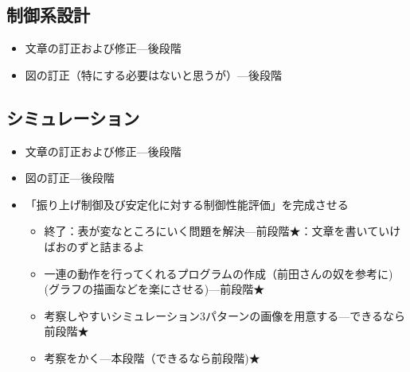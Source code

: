 	\subsection{制御系設計}
		\begin{itemize}
		  \item 文章の訂正および修正---後段階
		  \item 図の訂正（特にする必要はないと思うが）---後段階
		\end{itemize}
	\subsection{シミュレーション}
		\begin{itemize}
		  \item 文章の訂正および修正---後段階
		  \item 図の訂正---後段階
		  \item 「振り上げ制御及び安定化に対する制御性能評価」を完成させる
		  \begin{itemize}
		    \item 終了：表が変なところにいく問題を解決---前段階★：文章を書いていけばおのずと詰まるよ
		    \item 一連の動作を行ってくれるプログラムの作成（前田さんの奴を参考に)(グラフの描画などを楽にさせる)---前段階★
		    \item 考察しやすいシミュレーション3パターンの画像を用意する---できるなら前段階★
		   	\item 考察をかく---本段階（できるなら前段階)★
		  \end{itemize}
		\end{itemize}
